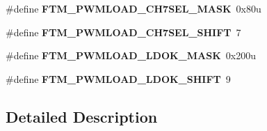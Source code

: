 \begin{DoxyCompactItemize}
\item 
\#define {\bfseries F\+T\+M\+\_\+\+P\+W\+M\+L\+O\+A\+D\+\_\+\+C\+H7\+S\+E\+L\+\_\+\+M\+A\+SK}~0x80u\hypertarget{group__FTM__Register__Masks_ga03933ee150a126784b19dde95dd28cc9}{}\label{group__FTM__Register__Masks_ga03933ee150a126784b19dde95dd28cc9}

\item 
\#define {\bfseries F\+T\+M\+\_\+\+P\+W\+M\+L\+O\+A\+D\+\_\+\+C\+H7\+S\+E\+L\+\_\+\+S\+H\+I\+FT}~7\hypertarget{group__FTM__Register__Masks_ga05ca23b88e7443efc46331367ccb6484}{}\label{group__FTM__Register__Masks_ga05ca23b88e7443efc46331367ccb6484}

\item 
\#define {\bfseries F\+T\+M\+\_\+\+P\+W\+M\+L\+O\+A\+D\+\_\+\+L\+D\+O\+K\+\_\+\+M\+A\+SK}~0x200u\hypertarget{group__FTM__Register__Masks_ga3e984a537814ee8e4130be4e822671d4}{}\label{group__FTM__Register__Masks_ga3e984a537814ee8e4130be4e822671d4}

\item 
\#define {\bfseries F\+T\+M\+\_\+\+P\+W\+M\+L\+O\+A\+D\+\_\+\+L\+D\+O\+K\+\_\+\+S\+H\+I\+FT}~9\hypertarget{group__FTM__Register__Masks_ga17e018e9c7812e93d45434bd8db18634}{}\label{group__FTM__Register__Masks_ga17e018e9c7812e93d45434bd8db18634}

\end{DoxyCompactItemize}


\subsection{Detailed Description}
